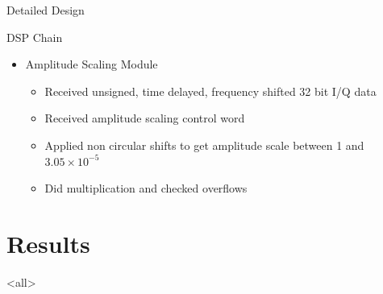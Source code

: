 \begin{frame}{\huge Detailed Design} 
\begin{block}{DSP Chain}
	\begin{itemize}
		\item Amplitude Scaling Module
		\begin{itemize}
			\item Received unsigned, time delayed, frequency shifted 32 bit I/Q data 
			\item Received amplitude scaling control word
			\item Applied non circular shifts to get amplitude scale between 1 and $3.05\times 10 ^{-5}$
			\item Did multiplication and checked overflows
		\end{itemize}
	\end{itemize}
	
\end{block}
\end{frame}

\section{Results}
\mode<all>{ 
}

